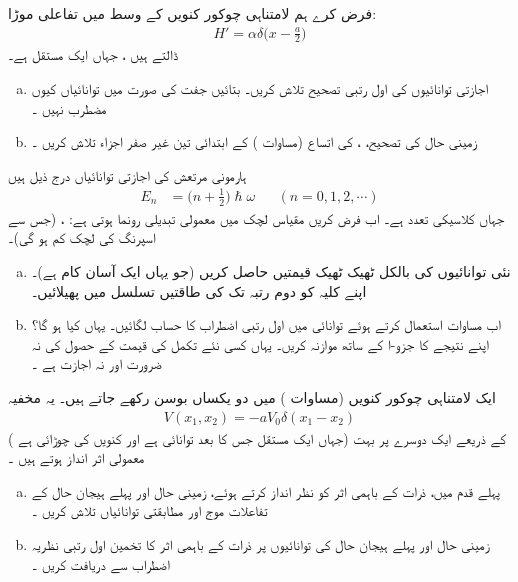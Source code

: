  
فرض کرے ہم لامتناہی چوکور کنویں کے وسط میں  تفاعلی موڑا:
\begin{align*}
H' = \alpha \delta \big(x - \frac{a}{2}\big)
\end{align*}
 ڈالتے ہیں ، جہاں  ایک مستقل ہے۔ 
\begin{enumerate}[a.]
\item
 اجازتی توانائیوں کی اول رتبی تصحیح تلاش کریں۔ بتائیں   جفت  کی صورت میں توانائیاں کیوں  مضطرب  نہیں   ۔
\item
 زمینی حال کی  تصحیح، ،  کی اتساع    (مساوات )   کے    ابتدائی تین غیر صفر اجزاء تلاش کریں  ۔
 \end{enumerate}
ہارمونی مرتعش   کی اجازتی توانائیاں درج ذیل ہیں 
\begin{align*}
E_n &= \big(n + \frac{1}{2}\big) \hslash \omega  && (n = 0, 1, 2, \cdots )
\end{align*}
جہاں  کلاسیکی تعدد ہے۔  اب فرض کریں  مقیاس لچک میں معمولی تبدیلی رونما ہوتی ہے: ، (جس سے اسپرنگ کی لچک کم ہو گی)۔
\begin{enumerate}[a.]
\item
 نئی  توانائیوں کی بالکل ٹھیک ٹھیک قیمتیں  حاصل  کریں  (جو یہاں ایک آسان کام ہے)۔ اپنے  کلیہ کو دوم رتبہ تک  کی طاقتیں تسلسل میں پھیلائیں۔ 
\item
 اب مساوات   استعمال کرتے ہوئے توانائی میں اول رتبی اضطراب کا حساب لگائیں۔ یہاں  کیا  ہو گا؟  اپنے نتیجے کا جزو-ا کے ساتھ موازنہ کریں۔  یہاں کسی نئے تکمل کی قیمت کے حصول کی نہ ضرورت اور نہ اجازت ہے ۔
 \end{enumerate}
ایک لامتناہی چوکور کنویں (مساوات  )   میں دو یکساں بوسن رکھے جاتے ہیں۔ یہ مخفیہ 
\begin{align*}
V(x_1, x_2) = -aV_0\delta (x_1 - x_2)
\end{align*}
( جہاں  ایک مستقل   جس کا بعد توانائی ہے  اور  کنویں کی چوڑائی ہے)  کے ذریعے ایک دوسرے پر بہت معمولی اثر انداز ہوتے ہیں ۔
\begin{enumerate}[a.]
\item
 پہلے قدم میں،  ذرات کے باہمی   اثر  کو نظر انداز کرتے ہوئے، زمینی حال اور پہلے ہیجان حال کے تفاعلات موج اور مطابقتی توانائیاں تلاش کریں ۔
\item
 زمینی حال اور پہلے    ہیجان  حال کی  توانائیوں پر ذرات کے باہمی  اثر کا تخمین اول رتبی نظریہ اضطراب سے دریافت کریں ۔
 \end{enumerate}


